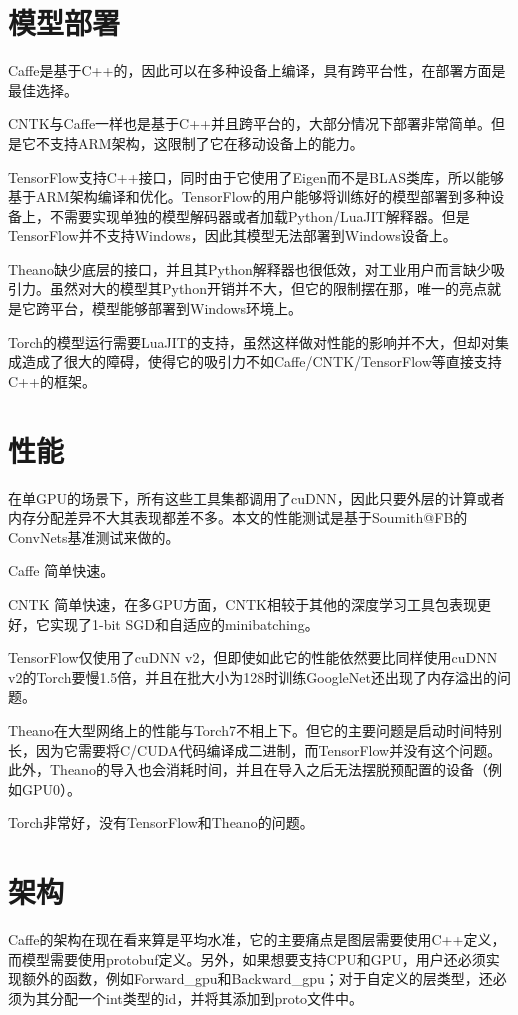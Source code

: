 \documentclass[a4paper,12pt]{ctexart}
\begin{document}
\section{模型部署}
Caffe是基于C++的，因此可以在多种设备上编译，具有跨平台性，在部署方面是最佳选择。

CNTK与Caffe一样也是基于C++并且跨平台的，大部分情况下部署非常简单。但是它不支持ARM架构，这限制了它在移动设备上的能力。

TensorFlow支持C++接口，同时由于它使用了Eigen而不是BLAS类库，所以能够基于ARM架构编译和优化。TensorFlow的用户能够将训练好的模型部署到多种设备上，不需要实现单独的模型解码器或者加载Python/LuaJIT解释器。但是TensorFlow并不支持Windows，因此其模型无法部署到Windows设备上。

Theano缺少底层的接口，并且其Python解释器也很低效，对工业用户而言缺少吸引力。虽然对大的模型其Python开销并不大，但它的限制摆在那，唯一的亮点就是它跨平台，模型能够部署到Windows环境上。

Torch的模型运行需要LuaJIT的支持，虽然这样做对性能的影响并不大，但却对集成造成了很大的障碍，使得它的吸引力不如Caffe/CNTK/TensorFlow等直接支持C++的框架。

\section{性能}

在单GPU的场景下，所有这些工具集都调用了cuDNN，因此只要外层的计算或者内存分配差异不大其表现都差不多。本文的性能测试是基于Soumith@FB的ConvNets基准测试来做的。

Caffe 简单快速。

CNTK 简单快速，在多GPU方面，CNTK相较于其他的深度学习工具包表现更好，它实现了1-bit SGD和自适应的minibatching。

TensorFlow仅使用了cuDNN v2，但即使如此它的性能依然要比同样使用cuDNN v2的Torch要慢1.5倍，并且在批大小为128时训练GoogleNet还出现了内存溢出的问题。

Theano在大型网络上的性能与Torch7不相上下。但它的主要问题是启动时间特别长，因为它需要将C/CUDA代码编译成二进制，而TensorFlow并没有这个问题。此外，Theano的导入也会消耗时间，并且在导入之后无法摆脱预配置的设备（例如GPU0）。

Torch非常好，没有TensorFlow和Theano的问题。

\section{架构}
Caffe的架构在现在看来算是平均水准，它的主要痛点是图层需要使用C++定义，而模型需要使用protobuf定义。另外，如果想要支持CPU和GPU，用户还必须实现额外的函数，例如Forward\_gpu和Backward\_gpu；对于自定义的层类型，还必须为其分配一个int类型的id，并将其添加到proto文件中。
\end{document}
